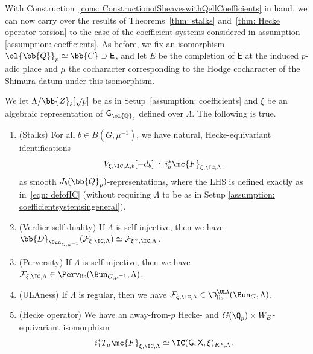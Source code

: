 \documentclass[letterpaper,11pt]{amsart}
\begin{document}
With Construction~\ref{cons: ConstructionofSheaveswithQellCoefficients} in hand, we can now carry over the results of Theorems~\ref{thm: stalks} and~\ref{thm: Hecke operator torsion} to the case of the coefficient systems considered in assumption \ref{assumption: coefficients}. As before, we fix an isomorphism $\ol{\bb{Q}}_{p} \simeq \bb{C}\supset \mathsf{E}$, and let $E$ be the completion of $\mathsf{E}$ at the induced $p$-adic place and $\mu$ the cocharacter corresponding to the Hodge cocharacter of the Shimura datum under this isomorphism.
\begin{theorem}{\label{thm: Hecke operator}}
We let $\Lambda/\bb{Z}_{\ell}[\sqrt{p}]$ be as in Setup~\ref{assumption: coefficients} and $\xi$ be an algebraic representation of $\mathsf{G}_{\ol{\mathbb{Q}}_{\ell}}$ defined over $\Lambda$. The following is true. 
\begin{enumerate}
\item (Stalks) For all $b \in B(G,\mu^{-1})$, we have natural, Hecke-equivariant identifications
\[
V_{\xi,\IC,\Lambda,b}[-d_b]\simeq i_b^*\mc{F}_{\xi, \IC, \Lambda}. 
\]
as smooth $J_{b}(\bb{Q}_{p})$-representations, where the LHS is defined exactly as in~\eqref{eqn: defofIC} (without requiring $\Lambda$ to be as in Setup \ref{assumption: coefficientsystemsingeneral}). 
\item (Verdier self-duality) If $\Lambda$ is self-injective, then we have $\bb{D}_{\Bun_{G,\mu^{-1}}}(\mathcal{F}_{\xi,\IC,\Lambda}) \simeq \mathcal{F}_{\xi^{\vee},\IC,\Lambda}$.
\item (Perversity) If $\Lambda$ is self-injective, then we have $\mathcal{F}_{\xi,\IC,\Lambda} \in \Perv_{\mathrm{lis}}(\Bun_{G,\mu^{-1}},\Lambda)$. 
\item (ULAness) If $\Lambda$ is regular, then we have  $\mathcal{F}_{\xi,\IC,\Lambda} \in \D^{\ULA}_{\mathrm{lis}}(\Bun_{G},\Lambda)$.
\item (Hecke operator) We have an away-from-$p$ Hecke- and $G(\Q_p)\times W_E$-equivariant isomorphism 
\[ 
i_{1}^{*}T_{\mu}\mc{F}_{\xi, \IC, \Lambda} \simeq \IC(\mathsf{G},\mathsf{X}, \xi)_{K^p,\Lambda}.
\] 
\end{enumerate}
\end{theorem}
\end{document}
